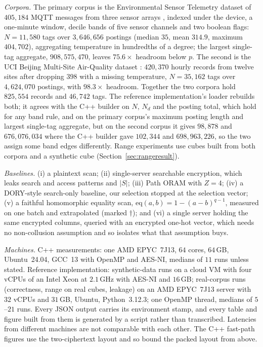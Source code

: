 \documentclass[a4paper,fleqn]{cas-sc}
\newif\ifauthorchecks
\newcommand{\authorcheck}[1]{\ifauthorchecks{\color{red}\textsf{[Authors: #1]}}\fi}
\begin{document}
\emph{Corpora.} The primary corpus is the Environmental Sensor Telemetry
dataset of $405{,}184$ MQTT messages from three sensor arrays
\citep{stafford_2020_environmental}, indexed under the device, a one-minute
window, decile bands of five sensor channels and two boolean flags:
$N=11{,}580$ tags over $3{,}646{,}656$ postings (median $35$, mean $314.9$,
maximum $404{,}702$), aggregating temperature in hundredths of a degree;
the largest single-tag aggregate, $908{,}575{,}470$, leaves $75.6\times$
headroom below $p$. The second is the UCI Beijing Multi-Site Air-Quality
dataset \citep{zhang2017cautionary,chen2019beijing}: $420{,}370$ hourly records
from twelve sites after dropping $398$ with a missing temperature, $N=35{,}162$
tags over $4{,}624{,}070$ postings, with $98.3\times$ headroom. Together the two
corpora hold $825{,}554$ records and $46{,}742$ tags. The reference
implementation's loader rebuilds both; it agrees with the C++ builder on $N$,
$N_d$ and the posting total, which hold for any band rule, and on the primary
corpus's maximum posting length and largest single-tag aggregate, but on the
second corpus it gives $98{,}878$ and $676{,}076{,}034$ where the C++ builder
gave $102{,}344$ and $698{,}963{,}226$, so the two assign some band edges
differently. Range experiments use cubes built from both corpora and a
synthetic cube (Section~\ref{sec:rangeresult}).

\emph{Baselines.} (i) a plaintext scan; (ii) single-server searchable
encryption, which leaks search and access patterns and $|S|$; (iii) Path ORAM
with $Z=4$; (iv) a DORY-style \citep{dory} search-only baseline, our selection
stopped at the selection vector; (v) a faithful homomorphic equality scan,
$\mathrm{eq}(a,b)=1-(a-b)^{q-1}$, measured on one batch and extrapolated (marked
$\dagger$); and (vi) a single server holding the same encrypted columns,
queried with an encrypted one-hot vector, which needs no non-collusion
assumption and so isolates what that assumption buys.

\emph{Machines.} C++ measurements: one AMD EPYC~7J13, $64$ cores, $64$\,GB,
Ubuntu~24.04, GCC~13 with OpenMP and AES-NI, medians of $11$ runs unless
stated. Reference implementation: synthetic-data runs on a cloud VM with
four vCPUs of an Intel Xeon at $2.1$\,GHz with AES-NI and $16$\,GB;
real-corpus runs (correctness, range on real cubes, leakage) on an AMD
EPYC~7J13 server with $32$ vCPUs and $31$\,GB, Ubuntu, Python~3.12.3; one
OpenMP thread, medians of $5$--$21$ runs. Every JSON output carries its
environment stamp, and every table and figure built from them is generated by
a script rather than transcribed. Latencies from different machines are not
comparable with each other. The
C++ fast-path figures use the two-ciphertext layout and so bound the packed
layout from above. \authorcheck{Re-measure Tables~\ref{tab:compute},
\ref{tab:baselines} and~\ref{tab:wan} with the packed, compressed layout in
C++.}
\end{document}
